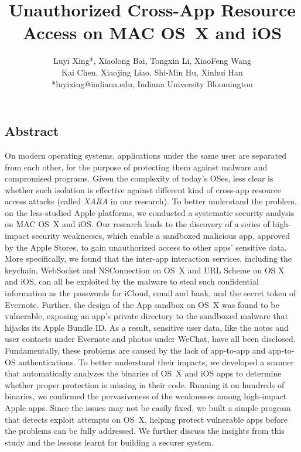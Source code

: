 \documentclass{article}
\begin{document}
\title{\Large \bf Unauthorized Cross-App Resource Access on MAC OS~X and iOS}




    
\author{
{\rm Luyi Xing{*}, Xiaolong Bai, Tongxin Li, XiaoFeng Wang}\\
Kai Chen, Xiaojing Liao, Shi-Min Hu, Xinhui Han\\
{*}luyixing@indiana.edu, Indiana University Bloomington
} 

\date{}

\maketitle









\subsection*{Abstract}

On modern operating systems, applications under the same user are separated from each other, for the purpose of protecting them against malware and compromised programs. Given the complexity of today's OSes, less clear is whether such isolation is effective against different kind of cross-app resource access attacks (called \textit{XARA} in our research).  To better understand the problem, on the less-studied Apple platforms, we conducted a systematic security analysis on MAC OS~X and iOS.  Our research leads to the discovery of a series of high-impact security weaknesses, which enable a sandboxed malicious app, approved by the Apple Stores, to gain unauthorized access to other apps' sensitive data. More specifically, we found that the inter-app interaction services, including the keychain, WebSocket and NSConnection on OS~X and URL Scheme on OS X and iOS, can all be exploited by the malware to steal such confidential information as the passwords for iCloud, email and bank, and the secret token of Evernote.  Further, the design of the App sandbox on OS~X was found to be vulnerable, exposing an app's private directory to the sandboxed malware that hijacks its Apple Bundle ID.  As a result, sensitive user data, like the notes and user contacts under Evernote and photos under WeChat, have all been disclosed.  Fundamentally, these problems are caused by the lack of app-to-app and app-to-OS authentications.  To better understand their impacts, we developed a scanner that automatically analyzes the binaries of OS~X and iOS apps to determine whether proper protection is missing in their code.  Running it on hundreds of binaries, we confirmed the pervasiveness of the weaknesses among high-impact Apple apps. Since the issues may not be easily fixed, we built a simple program that detects exploit attempts on OS~X, helping protect vulnerable apps before the problems can be fully addressed. We further discuss the insights from this study and the lessons learnt for building a securer system. 
\end{document}
